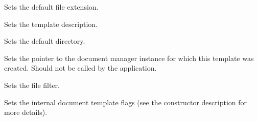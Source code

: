 Sets the default file extension.



Sets the template description.



Sets the default directory.



Sets the pointer to the document manager instance for which this template was created.
Should not be called by the application.



Sets the file filter.



Sets the internal document template flags (see the constructor description for more details).

